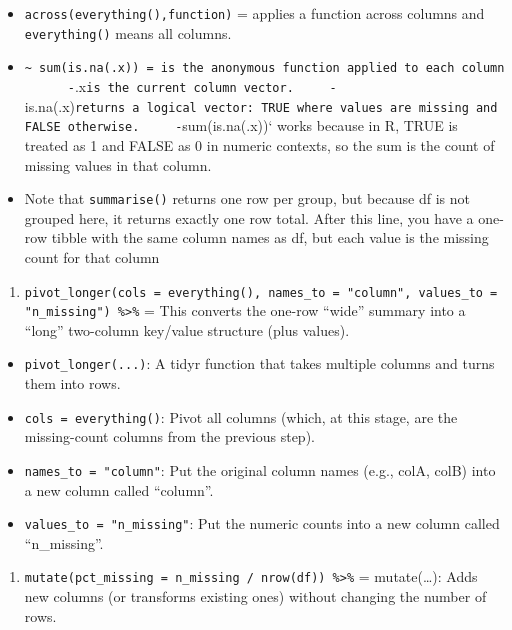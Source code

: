 \documentclass[
  11pt,
]{article}
\providecommand{\tightlist}{%
  \setlength{\itemsep}{0pt}\setlength{\parskip}{0pt}}
\begin{document}
\begin{itemize}
\item
  \texttt{across(everything(),function)} = applies a function across
  columns and \texttt{everything()} means all columns.
\item
  \texttt{\textasciitilde{}\ sum(is.na(.x))\ =\ is\ the\ anonymous\ function\ applied\ to\ each\ column\ \ \ \ \ \ -}.x\texttt{is\ the\ current\ column\ vector.\ \ \ \ \ -}is.na(.x)\texttt{returns\ a\ logical\ vector:\ TRUE\ where\ values\ are\ missing\ and\ FALSE\ otherwise.\ \ \ \ \ -}sum(is.na(.x))`
  works because in R, TRUE is treated as 1 and FALSE as 0 in numeric
  contexts, so the sum is the count of missing values in that column.
\item
  Note that \texttt{summarise()} returns one row per group, but because
  df is not grouped here, it returns exactly one row total. After this
  line, you have a one-row tibble with the same column names as df, but
  each value is the missing count for that column
\end{itemize}

\begin{enumerate}
\def\labelenumi{\arabic{enumi}.}
\setcounter{enumi}{2}
\tightlist
\item
  \texttt{pivot\_longer(cols\ =\ everything(),\ names\_to\ =\ "column",\ values\_to\ =\ "n\_missing")\ \%\textgreater{}\%}
  = This converts the one-row ``wide'' summary into a ``long''
  two-column key/value structure (plus values).
\end{enumerate}

\begin{itemize}
\tightlist
\item
  \texttt{pivot\_longer(...)}: A tidyr function that takes multiple
  columns and turns them into rows.
\item
  \texttt{cols\ =\ everything()}: Pivot all columns (which, at this
  stage, are the missing-count columns from the previous step).
\item
  \texttt{names\_to\ =\ "column"}: Put the original column names (e.g.,
  colA, colB) into a new column called ``column''.
\item
  \texttt{values\_to\ =\ "n\_missing"}: Put the numeric counts into a
  new column called ``n\_missing''.
\end{itemize}

\begin{enumerate}
\def\labelenumi{\arabic{enumi}.}
\setcounter{enumi}{3}
\tightlist
\item
  \texttt{mutate(pct\_missing\ =\ n\_missing\ /\ nrow(df))\ \%\textgreater{}\%}
  = mutate(\ldots): Adds new columns (or transforms existing ones)
  without changing the number of rows.
\end{enumerate}
\end{document}
